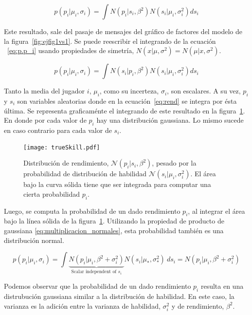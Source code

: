 \documentclass[11pt,twoside,spanish]{report} %
\newcommand{\N}{\mathcal{N}}
\begin{document}
\begin{equation}\label{eq:p.p_i}
p(p_i|\mu_i,\sigma_i) = \int N(p_i| s_i, \beta^2)N(s_i|\mu_i,\sigma_i^2) ds_i
\end{equation}

Este resultado, sale del pasaje de mensajes del gr\'afico de factores del modelo de la figura~\ref{fig:ejfig1vs1}. 
Se puede reescribir el integrando de la ecuaci\'on ~\ref{eq:p.p_i} usando propiedades de simetr\'ia, $ N (x| \mu, \sigma^2) = N (\mu| x, \sigma^2)$.

\begin{equation}\label{eq:rend}
p(p_i|\mu_i,\sigma_i) = \int N(s_i| p_i, \beta^2)N(s_i|\mu_i,\sigma_i^2) ds_i
\end{equation}

Tanto la media del jugador $i$, $\mu_i$, como su incerteza, $\sigma_i$, son escalares.
A su vez, $p_i$ y $s_i$ son variables aleatorias donde en la ecuaci\'on~\ref{eq:rend} se integra por \'esta \'ultima.
Se representa graficam\'ente el integrando de este resultado en la figura~\ref{fig:fig8}.
En donde por cada valor de $p_i$ hay una distribuci\'on gaussiana.
Lo mismo sucede en caso contrario para cada valor de $s_i$.

\begin{figure}[H]
	\centering
	\texttt{[image: trueSkill.pdf]}
	\caption{Distribuci\'on de rendimiento, $\N(p_i|s_i,\beta^2)$, pesado por la probabilidad de distribuci\'on de habilidad $\N(s_i|\mu_i,\sigma_i^2)$. El \'area bajo la curva s\'olida tiene que ser integrada para computar una cierta probabilidad $p_i$.}
	\label{fig:fig8}
\end{figure}

Luego, se computa la probabilidad de un dado rendimiento $p_i$, al integrar el \'area bajo la l\'inea s\'olida de la figura~\ref{fig:fig8}.
Utilizando la propiedad de producto de gaussiana \ref{eq:multiplicacion_normales}, esta probabilidad tambi\'en es una distribuci\'on normal.

\begin{equation}\label{eq:probrend}
p(p_i|\mu_i,\sigma_i) = \int \underbrace{N(p_i|\mu_i,\beta^2 + \sigma_i^2)}_{\text{Scalar independent of $s_i$}} N(s_i|\mu_{*},\sigma_{*}^2)  \ ds_i  = N(p_i|\mu_i,\beta^2 + \sigma_i^2)
\end{equation}

Podemos observar que la probabilidad de un dado rendimiento $p_i$ resulta en una distrubuci\'on gaussiana similar a la distribuci\'on de habilidad.
En este caso, la varianza es la adici\'on entre la varianza de habilidad, $\sigma_i^2$ y de rendimiento, $\beta^2$.
\end{document}

